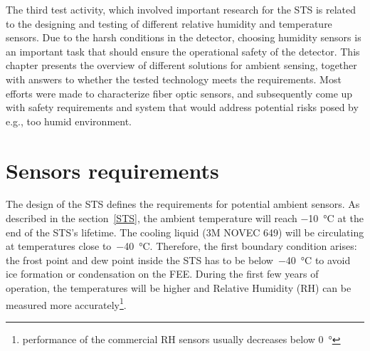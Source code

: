 The third test activity, which involved important research for the \gls{STS} is related to the designing and testing of different relative humidity and temperature sensors. Due to the harsh conditions in the detector, choosing humidity sensors is an important task that should ensure the operational safety of the detector. This chapter presents the overview of different solutions for ambient sensing, together with answers to whether the tested technology meets the requirements. Most efforts were made to characterize fiber optic sensors, and subsequently come up with safety requirements and system that would address potential risks posed by e.g., too humid environment. 


\section{Sensors requirements}

The design of the \gls{STS} \cite{Heuser:54798} defines the requirements for potential ambient sensors. As described in the section~\ref{STS}, the ambient temperature will reach \SI{-10}{\celsius} at the end of the \gls{STS}'s lifetime. The cooling liquid (3M NOVEC 649) will be circulating at temperatures close to~\SI{-40}{\celsius}. Therefore, the first boundary condition arises: the frost point and dew point inside the \gls{STS} has to be below~\SI{-40}{\celsius} to avoid ice formation or condensation on the \gls{FEE}.
During the first few years of operation, the temperatures will be higher and Relative Humidity (\gls{RH}) can be measured more accurately\footnote{performance of the commercial RH sensors usually decreases below \SI{0}{\degree}}. 

